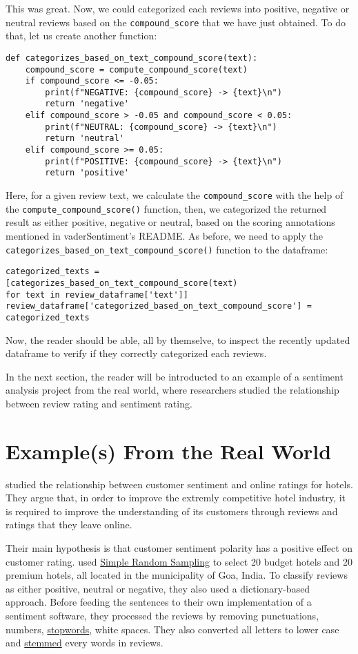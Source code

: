 	This was great. Now, we could categorized each reviews into positive, negative or neutral reviews based on the \verb|compound_score| that we have just obtained. To do that, let us create another function:
	\begin{Verbatim}
def categorizes_based_on_text_compound_score(text):
	compound_score = compute_compound_score(text)
	if compound_score <= -0.05:
		print(f"NEGATIVE: {compound_score} -> {text}\n")
		return 'negative'
	elif compound_score > -0.05 and compound_score < 0.05:
		print(f"NEUTRAL: {compound_score} -> {text}\n")
		return 'neutral'
	elif compound_score >= 0.05:
		print(f"POSITIVE: {compound_score} -> {text}\n")
		return 'positive'
	\end{Verbatim}
	Here, for a given review text, we calculate the \verb|compound_score| with the help of the \verb|compute_compound_score()| function, then, we categorized the returned result as either positive, negative or neutral, based on the scoring annotations mentioned in vaderSentiment's README. As before, we need to apply the \verb|categorizes_based_on_text_compound_score()| function to the dataframe:
	\begin{Verbatim}
categorized_texts =
[categorizes_based_on_text_compound_score(text) 
for text in review_dataframe['text']]
review_dataframe['categorized_based_on_text_compound_score'] = 
categorized_texts
	\end{Verbatim}
	Now, the reader should be able, all by themselve, to inspect the recently updated dataframe to verify if they correctly categorized each reviews.
	
	In the next section, the reader will be introducted to an example of a sentiment analysis project from the real world, where researchers studied the relationship between review rating and sentiment rating.
	
	\section{Example(s) From the Real World}\label{sec:examplerealworld}
	\cite{geetha_relationship_2017} studied the relationship between customer sentiment and online ratings for hotels. They argue that, in order to improve the extremly competitive hotel industry, it is required to improve the understanding of its customers through reviews and ratings that they leave online.
	
	 Their main hypothesis is that customer sentiment polarity has a positive effect on customer rating. \cite{geetha_relationship_2017} used \href{https://en.wikipedia.org/wiki/Simple_random_sample}{Simple Random Sampling} to select 20 budget hotels and 20 premium hotels, all located in the municipality of Goa, India. To classify reviews as either positive, neutral or negative, they also used a dictionary-based approach. Before feeding the sentences to their own implementation of a sentiment software, they processed the reviews by removing punctuations, numbers, \href{https://en.wikipedia.org/wiki/Stop_words}{stopwords}, white spaces. They also converted all letters to lower case and \href{https://en.wikipedia.org/wiki/Stemming}{stemmed} every words in reviews.
	
